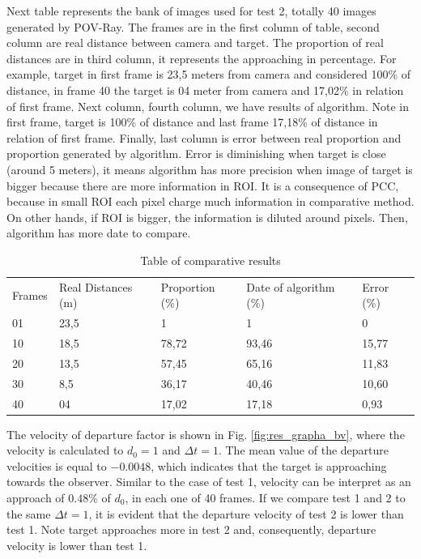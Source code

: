 Next table represents the bank of images used for test 2, totally 40 images generated by POV-Ray.
The frames are in the first column of table, second column are real distance between camera and target.
The proportion of real distances are in third column, it represents the approaching in percentage. For example, 
target in first frame is 23,5 meters from camera and considered 100\% of distance, in frame 40 the target is 04 meter 
from camera and 17,02\% in relation of first frame. Next column, fourth column, we have results of algorithm. 
Note in first frame, target is 100\% of distance and last frame 17,18\% of distance in relation of first frame.
Finally, last column is error between real proportion and proportion generated by algorithm. 
Error is diminishing when target is close (around 5 meters), it means algorithm has more precision 
when image of target is bigger because there are more information in ROI. It is a consequence of PCC, 
because in small ROI each pixel charge much information in comparative method. On other hands, if ROI is bigger,
the information is diluted around pixels. Then, algorithm has more date to compare.

\begin{table}[H]
\setlength{\tabcolsep}{1 pt} 
\caption{Table of comparative results}
\begin{tabular}{lllll}
Frames & Real Distances (m) & Proportion (\%) & Date of algorithm (\%) & Error (\%)\\
01 & 23,5 & 1 & 1 & 0 \\
10 & 18,5 & 78,72 & 93,46 & 15,77 \\
20 & 13,5 & 57,45 & 65,16 & 11,83 \\
30 & 8,5 & 36,17 & 40,46 & 10,60 \\
40 & 04 & 17,02 & 17,18 & 0,93
\end{tabular}
\end{table}

The velocity of departure factor is shown in 
Fig. \ref{fig:res_grapha_bv}, where the velocity is calculated
to $d_0=1$ and $\Delta t=1$. The mean value of the departure
velocities is equal to $-0.0048$, which indicates that the %
target is approaching towards the observer. Similar
to the case of test 1, velocity can be interpret
as an approach of $0.48\%$ of $d_0$, in each one of 40 frames.
If we compare test 1 and 2 to the same $\Delta t=1$, it is evident 
that the departure velocity of  test 2  is lower than test 1. 
Note target approaches more in test 2 and, consequently, departure
velocity is lower than test 1.

